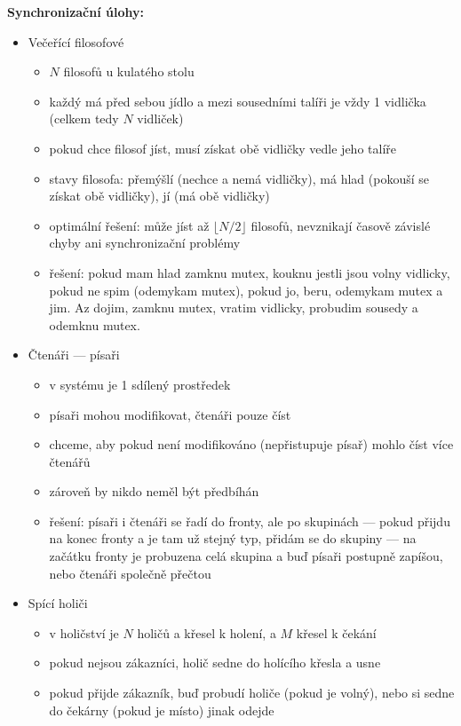 \textbf{Synchronizační úlohy:}
\begin{itemize}
	\item Večeřící filosofové
	\begin{itemize}
		\item $N$ filosofů u kulatého stolu
		\item každý má před sebou jídlo a mezi sousedními talíři je vždy 1 vidlička (celkem tedy $N$ vidliček)
		\item pokud chce filosof jíst, musí získat obě vidličky vedle jeho talíře
		\item stavy filosofa: přemýšlí (nechce a nemá vidličky), má hlad (pokouší se získat obě vidličky), jí (má obě vidličky)
		\item optimální řešení: může jíst až $\lfloor N/2 \rfloor$ filosofů, nevznikají časově závislé chyby ani synchronizační problémy
		\item řešení: pokud mam hlad zamknu mutex, kouknu jestli jsou volny vidlicky, pokud ne spim (odemykam mutex), pokud jo, beru, odemykam mutex a jim. Az dojim, zamknu mutex, vratim vidlicky, probudim sousedy a odemknu mutex.
	\end{itemize}
	
	\item Čtenáři --- písaři
	\begin{itemize}
		\item v systému je 1 sdílený prostředek
		\item písaři mohou modifikovat, čtenáři pouze číst
		\item chceme, aby pokud není modifikováno (nepřistupuje písař) mohlo číst více čtenářů
		\item zároveň by nikdo neměl být předbíhán
		\item řešení: písaři i čtenáři se řadí do fronty, ale po skupinách --- pokud přijdu na konec fronty a je tam už stejný typ, přidám se do skupiny --- na začátku fronty je probuzena celá skupina a buď písaři postupně zapíšou, nebo čtenáři společně přečtou
	\end{itemize}
	
	\item Spící holiči
	\begin{itemize}
		\item v holičství je $N$ holičů a křesel k holení, a $M$ křesel k čekání
		\item pokud nejsou zákazníci, holič sedne do holícího křesla a usne
		\item pokud přijde zákazník, buď probudí holiče (pokud je volný), nebo si sedne do čekárny (pokud je místo) jinak odejde
	\end{itemize}
\end{itemize}

